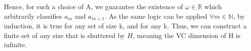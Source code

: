 Hence, for such a choice of A, we guarantee the existence of $\omega \in \mathbb{R}$ which arbitrarily classifies $a_m$ and $a_{m+1}$. As the same logic can be applied $\forall m\in \mathbb{N}$, by induction, it is true for any set of size k, and for any k. Thus, we can construct a finite set of any size that is shuttered by $H$, meaning the VC dimension of H is infinite. 